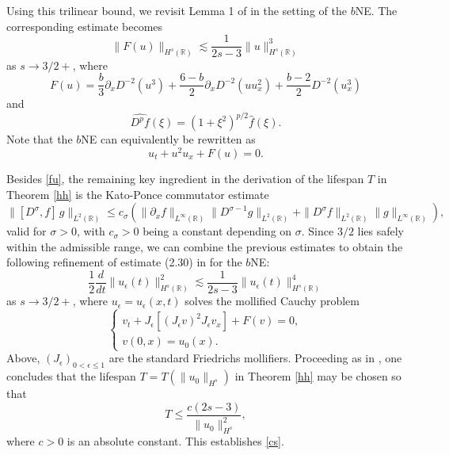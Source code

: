 \documentclass{amsart}
\newcommand{\R}{\mathbb R}
\newcommand{\p}{\partial}
\begin{document}
Using this trilinear bound, we revisit Lemma 1 of \cite{HH14} in the setting of the $b$NE. The corresponding estimate becomes
\begin{equation}
\|F(u)\|_{H^s(\R)}\lesssim \frac{1}{2s-3}\|u\|^3_{H^s(\R)}\label{fu}
\end{equation}
as $s\to 3/2+$, where
\begin{equation*}
F(u)= \frac{b}{3}\p_x D^{-2}(u^3)+\frac{6-b}{2}\p_x D^{-2}(u u_x^2)+\frac{b-2}{2}D^{-2}(u_x^3)
\end{equation*}
and 
\[
\widehat{D^p f}(\xi)= (1+\xi^2)^{p/2}\hat{f}(\xi).
\]
Note that the $b$NE can equivalently be rewritten as
\begin{equation*}
u_t+u^2u_x+F(u)=0.
\end{equation*}

Besides \eqref{fu}, the remaining key ingredient in the derivation of the lifespan $T$ in Theorem \ref{hh} is the Kato-Ponce commutator estimate 
\begin{equation*}
\|[D^\sigma, f]\,g\|_{L^2(\R)}\leq c_\sigma\left(\|\p_xf\|_{L^\infty(\R)}\|D^{\sigma-1}g\|_{L^2(\R)}+\|D^\sigma f\|_{L^2(\R)}\|g\|_{L^\infty(\R)}\right),
\end{equation*}
valid for $\sigma>0$, with $c_\sigma>0$ being a constant depending on $\sigma$. Since $3/2$ lies safely within the admissible range, we can combine the previous estimates to obtain the following refinement of estimate (2.30) in \cite{HH14} for the $b$NE:
\begin{equation*}
\frac{1}{2}\frac{d}{dt}\|u_\epsilon(t)\|^2_{H^s(\R)}\lesssim \frac{1}{2s-3} \|u_\epsilon(t)\|^4_{H^s(\R)}
\end{equation*}
as $s\to 3/2+$, where $u_\epsilon=u_\epsilon(x,t)$ solves the mollified Cauchy problem
\begin{equation*}
\begin{cases}
v_t+J_\epsilon[(J_\epsilon v)^2 J_\epsilon v_x]+F(v)=0,\\
v(0,x)=u_0(x).
\end{cases}
\end{equation*}
Above, $(J_\epsilon)_{0<\epsilon\leq 1}$ are the standard Friedrichs mollifiers. Proceeding as in \cite{HH14}, one concludes  that the lifespan $T=T( \|u_0\|_{H^s})$ in Theorem \ref{hh} may be chosen so that
\begin{equation*}
T\leq \frac{c(2s-3)}{\|u_0\|^2_{H^s}},
\end{equation*}
where $c>0$ is an absolute constant. This establishes \eqref{cs}.
\end{document}
